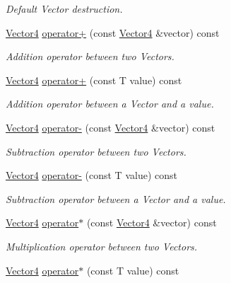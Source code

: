 \begin{DoxyCompactItemize}
\begin{DoxyCompactList}\small\item\em Default Vector destruction. \end{DoxyCompactList}\item 
\hyperlink{classsparky_1_1_vector4}{Vector4} \hyperlink{classsparky_1_1_vector4_a003089afd91c1d5b12884412c534160a}{operator+} (const \hyperlink{classsparky_1_1_vector4}{Vector4} \&vector) const 
\begin{DoxyCompactList}\small\item\em Addition operator between two Vectors. \end{DoxyCompactList}\item 
\hyperlink{classsparky_1_1_vector4}{Vector4} \hyperlink{classsparky_1_1_vector4_aca45989a3d8c11d50d0f2fbe0db60927}{operator+} (const T value) const 
\begin{DoxyCompactList}\small\item\em Addition operator between a Vector and a value. \end{DoxyCompactList}\item 
\hyperlink{classsparky_1_1_vector4}{Vector4} \hyperlink{classsparky_1_1_vector4_a637c963386f3afe3d100f0ef72d2b186}{operator-\/} (const \hyperlink{classsparky_1_1_vector4}{Vector4} \&vector) const 
\begin{DoxyCompactList}\small\item\em Subtraction operator between two Vectors. \end{DoxyCompactList}\item 
\hyperlink{classsparky_1_1_vector4}{Vector4} \hyperlink{classsparky_1_1_vector4_aba0ab43852ba3ab49d41f84cd60ea892}{operator-\/} (const T value) const 
\begin{DoxyCompactList}\small\item\em Subtraction operator between a Vector and a value. \end{DoxyCompactList}\item 
\hyperlink{classsparky_1_1_vector4}{Vector4} \hyperlink{classsparky_1_1_vector4_a7989fb3c4ea01036313c39d752286b35}{operator$\ast$} (const \hyperlink{classsparky_1_1_vector4}{Vector4} \&vector) const 
\begin{DoxyCompactList}\small\item\em Multiplication operator between two Vectors. \end{DoxyCompactList}\item 
\hyperlink{classsparky_1_1_vector4}{Vector4} \hyperlink{classsparky_1_1_vector4_a7ae1fffa3027e5c2e005b7344fcbe0b8}{operator$\ast$} (const T value) const 

\end{DoxyCompactItemize}
